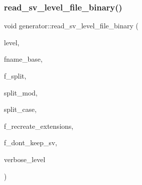 \subsubsection{\texorpdfstring{read\+\_\+sv\+\_\+level\+\_\+file\+\_\+binary()}{read\_sv\_level\_file\_binary()}}
{\footnotesize\ttfamily void generator\+::read\+\_\+sv\+\_\+level\+\_\+file\+\_\+binary (\begin{DoxyParamCaption}\item[{\mbox{\hyperlink{galois_8h_a09fddde158a3a20bd2dcadb609de11dc}{I\+NT}}}]{level,  }\item[{\mbox{\hyperlink{galois_8h_ab6cc7b4aeb6ea31aba2b3fbfc83ff5e6}{B\+Y\+TE}} $\ast$}]{fname\+\_\+base,  }\item[{\mbox{\hyperlink{galois_8h_a09fddde158a3a20bd2dcadb609de11dc}{I\+NT}}}]{f\+\_\+split,  }\item[{\mbox{\hyperlink{galois_8h_a09fddde158a3a20bd2dcadb609de11dc}{I\+NT}}}]{split\+\_\+mod,  }\item[{\mbox{\hyperlink{galois_8h_a09fddde158a3a20bd2dcadb609de11dc}{I\+NT}}}]{split\+\_\+case,  }\item[{\mbox{\hyperlink{galois_8h_a09fddde158a3a20bd2dcadb609de11dc}{I\+NT}}}]{f\+\_\+recreate\+\_\+extensions,  }\item[{\mbox{\hyperlink{galois_8h_a09fddde158a3a20bd2dcadb609de11dc}{I\+NT}}}]{f\+\_\+dont\+\_\+keep\+\_\+sv,  }\item[{\mbox{\hyperlink{galois_8h_a09fddde158a3a20bd2dcadb609de11dc}{I\+NT}}}]{verbose\+\_\+level }\end{DoxyParamCaption})}

\mbox{\label{classgenerator_acbe231c7d624d77eb2bf870bd3829c23}} 
